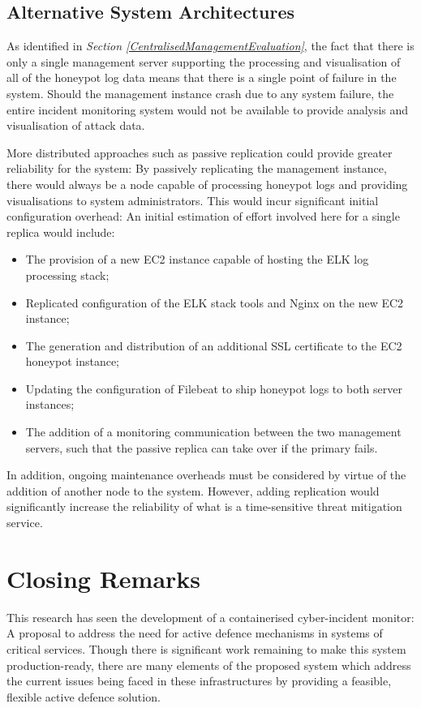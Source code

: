 \subsection{Alternative System Architectures \label{AlternativeSystemArchitectureFW}}
 As identified in \textit{Section \ref{CentralisedManagementEvaluation}}, the fact that there is only a single management server supporting the processing and visualisation of all of the honeypot log data means that there is a single point of failure in the system. Should the management instance crash due to any system failure, the entire incident monitoring system would not be available to provide analysis and visualisation of attack data.
 
More distributed approaches such as passive replication could provide greater reliability for the system: By passively replicating the management instance, there would always be a node capable of processing honeypot logs and providing visualisations to system administrators. This would incur significant initial configuration overhead: An initial estimation of effort involved here for a single replica would include:
\begin{itemize}
\item The provision of a new EC2 instance capable of hosting the ELK log processing stack;
\item Replicated configuration of the ELK stack tools and Nginx on the new EC2 instance;
\item The generation and distribution of an additional SSL certificate to the EC2 honeypot instance;
\item Updating the configuration of Filebeat to ship honeypot logs to both server instances;
\item The addition of a monitoring communication between the two management servers, such that the passive replica can take over if the primary fails.
\end{itemize}

In addition, ongoing maintenance overheads must be considered by virtue of the addition of another node to the system. However, adding replication would significantly increase the reliability of what is a time-sensitive threat mitigation service.


%
% 
\section{Closing Remarks} \label{FinalRemarks}
This research has seen the development of a containerised cyber-incident monitor: A proposal to address the need for active defence mechanisms in systems of critical services. Though there is significant work remaining to make this system production-ready, there are many elements of the proposed system which address the current issues being faced in these infrastructures by providing a feasible, flexible active defence solution.

